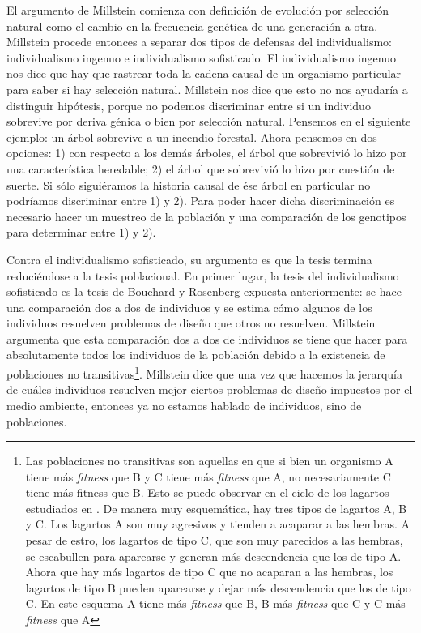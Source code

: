 El argumento de Millstein comienza con definición de evolución por selección natural como el cambio en la frecuencia genética de una generación a otra. Millstein procede entonces a separar dos tipos de defensas del individualismo: individualismo ingenuo e individualismo sofisticado. El individualismo ingenuo nos dice que hay que rastrear toda la cadena causal de un organismo particular para saber si hay selección natural. Millstein nos dice que esto no nos ayudaría a distinguir hipótesis, porque no podemos discriminar entre si un individuo sobrevive por deriva génica o bien por selección natural. Pensemos en el siguiente ejemplo: un árbol sobrevive a un incendio forestal. Ahora pensemos en dos opciones: 1) con respecto a los demás árboles, el árbol que sobrevivió lo hizo por una característica heredable; 2) el árbol que sobrevivió lo hizo por cuestión de suerte. Si sólo siguiéramos la historia causal de ése árbol en particular no podríamos discriminar entre 1) y 2). Para poder hacer dicha discriminación es necesario hacer un muestreo de la población y una comparación de los genotipos para determinar entre 1) y 2).

Contra el individualismo sofisticado, su argumento es que la tesis termina reduciéndose a la tesis poblacional. En primer lugar, la tesis del individualismo sofisticado es la tesis de Bouchard y Rosenberg expuesta anteriormente: se hace una comparación dos a dos de individuos y se estima cómo algunos de los individuos resuelven problemas de diseño que otros no resuelven. Millstein argumenta que esta comparación dos a dos de individuos se tiene que hacer para absolutamente todos los individuos de la población debido a la existencia de poblaciones no transitivas\footnote{Las poblaciones no transitivas son aquellas en que si bien un organismo A tiene más \emph{fitness} que B y C tiene más \emph{fitness} que A, no necesariamente C tiene más fitness que B. Esto se puede observar en el ciclo de los lagartos estudiados en \cite{Sinervo1996}. De manera muy esquemática, hay tres tipos de lagartos A, B y C. Los lagartos A son muy agresivos y tienden a acaparar a las hembras. A pesar de estro, los lagartos de tipo C, que son muy parecidos a las hembras, se escabullen para aparearse y generan más descendencia que los de tipo A. Ahora que hay más lagartos de tipo C que no acaparan a las hembras, los lagartos de tipo B pueden aparearse y dejar más descendencia que los de tipo C. En este esquema A tiene más \emph{fitness} que B, B más \emph{fitness} que C y C más \emph{fitness} que A}. Millstein dice que una vez que hacemos la jerarquía de cuáles individuos resuelven mejor ciertos problemas de diseño impuestos por el medio ambiente, entonces ya no estamos hablado de individuos, sino de poblaciones.

